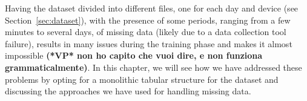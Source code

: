 Having the dataset divided into different files, one for each day
and device (see Section~\ref{sec:dataset}), with the presence of
some periods, ranging from a few minutes to several days,
of missing data (likely due to a data collection tool failure),
results in many issues during the training phase and makes it
almost impossible \textbf{(*VP* non ho capito che vuoi dire, e non funziona grammaticalmente)}. In this chapter, we will see how we have
addressed these problems by opting for a monolithic tabular
structure for the dataset and discussing the approaches we have
used for handling missing data.


